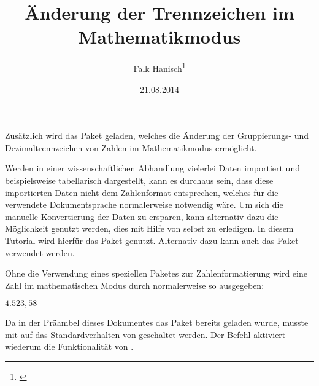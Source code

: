 \documentclass[english,ngerman]{tudscrartcl}
\begin{document}
\title{Änderung der Trennzeichen im Mathematikmodus}
\author{Falk Hanisch\thanks{\noexpand\href{mailto:\tudscrmail}{\tudscrmail}}}
\date{21.08.2014}
\makeatletter
\begingroup%
  \def\and{, }%
  \let\thanks\@gobble%
  \let\footnote\@gobble%
\endgroup%
\markright{\@title}
\makeatother
\StartTutorial
%
%
Zusätzlich wird das Paket  geladen, welches die Änderung der 
Gruppierungs- und Dezimaltrennzeichen von Zahlen im Mathematikmodus ermöglicht.
%
\begin{Preamble}
\usepackage{mathswap}
\end{Preamble}
%
Werden in einer wissenschaftlichen Abhandlung vielerlei Daten importiert und 
beispielsweise tabellarisch dargestellt, kann es durchaus sein, dass diese 
importierten Daten nicht dem Zahlenformat entsprechen, welches für die 
verwendete Dokumentsprache normalerweise notwendig wäre. Um sich die manuelle 
Konvertierung der Daten zu ersparen, kann alternativ dazu die Möglichkeit 
genutzt werden, dies mit Hilfe von  selbst zu erledigen. In 
diesem Tutorial wird hierfür das Paket  genutzt. Alternativ 
dazu kann auch das Paket  verwendet werden.

Ohne die Verwendung eines speziellen Paketes zur Zahlenformatierung wird eine 
Zahl im mathematischen Modus durch  normalerweise so 
ausgegeben: 
%
\begin{Trunk*}
\mathswapoff
\(4.523,58\)
\mathswapon
\end{Trunk*}
%
Da in der Präambel dieses Dokumentes das Paket  bereits 
geladen wurde, musste mit  auf das Standardverhalten von 
 geschaltet werden. Der Befehl  aktiviert 
wiederum die Funktionalität von .
\end{document}
